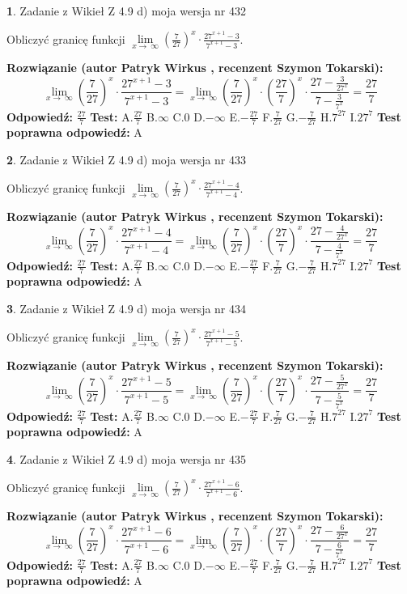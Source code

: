 \documentclass[12pt, a4paper]{article}
\theoremstyle{definition} %
\newtheorem{zad}{}
\newcommand{\zadStart}[1]{\begin{zad}#1\newline}
\newcommand{\zadStop}{\end{zad}}
\newcommand{\rozwStart}[2]{\noindent \textbf{Rozwiązanie (autor #1 , recenzent #2): }\newline}
\newcommand{\rozwStop}{\newline}
\newcommand{\odpStart}{\noindent \textbf{Odpowiedź:}\newline}
\newcommand{\odpStop}{\newline}
\newcommand{\testStart}{\noindent \textbf{Test:}\newline}
\newcommand{\testStop}{\newline}
\newcommand{\kluczStart}{\noindent \textbf{Test poprawna odpowiedź:}\newline}
\newcommand{\kluczStop}{\newline}
\begin{document}
\zadStart{Zadanie z Wikieł Z 4.9 d) moja wersja nr 432}


Obliczyć granicę funkcji  $\lim\limits_{x\to\ \infty}(\frac{7}{27})^{x}\cdot\frac{27^{x+1}-3}{7^{x+1}-3}$.
\zadStop
\rozwStart{Patryk Wirkus}{Szymon Tokarski}
$$\lim\limits_{x\to\ \infty}(\frac{7}{27})^{x}\cdot\frac{27^{x+1}-3}{7^{x+1}-3}=\lim\limits_{x\to\ \infty}(\frac{7}{27})^{x}\cdot(\frac{27}{7})^{x} \cdot \frac{27-\frac{3}{27^{x}}}{7-\frac{3}{7^{x}}} = \frac{27}{7}$$
\rozwStop
\odpStart
$\frac{27}{7}$
\odpStop
\testStart
A.$\frac{27}{7}$ B.$\infty$ C.$0$ D.$-\infty$ E.$-\frac{27}{7}$
F.$\frac{7}{27}$ G.$-\frac{7}{27}$
H.$7^{27}$
I.$27^{7}$
\testStop
\kluczStart
A
\kluczStop



\zadStart{Zadanie z Wikieł Z 4.9 d) moja wersja nr 433}


Obliczyć granicę funkcji  $\lim\limits_{x\to\ \infty}(\frac{7}{27})^{x}\cdot\frac{27^{x+1}-4}{7^{x+1}-4}$.
\zadStop
\rozwStart{Patryk Wirkus}{Szymon Tokarski}
$$\lim\limits_{x\to\ \infty}(\frac{7}{27})^{x}\cdot\frac{27^{x+1}-4}{7^{x+1}-4}=\lim\limits_{x\to\ \infty}(\frac{7}{27})^{x}\cdot(\frac{27}{7})^{x} \cdot \frac{27-\frac{4}{27^{x}}}{7-\frac{4}{7^{x}}} = \frac{27}{7}$$
\rozwStop
\odpStart
$\frac{27}{7}$
\odpStop
\testStart
A.$\frac{27}{7}$ B.$\infty$ C.$0$ D.$-\infty$ E.$-\frac{27}{7}$
F.$\frac{7}{27}$ G.$-\frac{7}{27}$
H.$7^{27}$
I.$27^{7}$
\testStop
\kluczStart
A
\kluczStop



\zadStart{Zadanie z Wikieł Z 4.9 d) moja wersja nr 434}


Obliczyć granicę funkcji  $\lim\limits_{x\to\ \infty}(\frac{7}{27})^{x}\cdot\frac{27^{x+1}-5}{7^{x+1}-5}$.
\zadStop
\rozwStart{Patryk Wirkus}{Szymon Tokarski}
$$\lim\limits_{x\to\ \infty}(\frac{7}{27})^{x}\cdot\frac{27^{x+1}-5}{7^{x+1}-5}=\lim\limits_{x\to\ \infty}(\frac{7}{27})^{x}\cdot(\frac{27}{7})^{x} \cdot \frac{27-\frac{5}{27^{x}}}{7-\frac{5}{7^{x}}} = \frac{27}{7}$$
\rozwStop
\odpStart
$\frac{27}{7}$
\odpStop
\testStart
A.$\frac{27}{7}$ B.$\infty$ C.$0$ D.$-\infty$ E.$-\frac{27}{7}$
F.$\frac{7}{27}$ G.$-\frac{7}{27}$
H.$7^{27}$
I.$27^{7}$
\testStop
\kluczStart
A
\kluczStop



\zadStart{Zadanie z Wikieł Z 4.9 d) moja wersja nr 435}


Obliczyć granicę funkcji  $\lim\limits_{x\to\ \infty}(\frac{7}{27})^{x}\cdot\frac{27^{x+1}-6}{7^{x+1}-6}$.
\zadStop
\rozwStart{Patryk Wirkus}{Szymon Tokarski}
$$\lim\limits_{x\to\ \infty}(\frac{7}{27})^{x}\cdot\frac{27^{x+1}-6}{7^{x+1}-6}=\lim\limits_{x\to\ \infty}(\frac{7}{27})^{x}\cdot(\frac{27}{7})^{x} \cdot \frac{27-\frac{6}{27^{x}}}{7-\frac{6}{7^{x}}} = \frac{27}{7}$$
\rozwStop
\odpStart
$\frac{27}{7}$
\odpStop
\testStart
A.$\frac{27}{7}$ B.$\infty$ C.$0$ D.$-\infty$ E.$-\frac{27}{7}$
F.$\frac{7}{27}$ G.$-\frac{7}{27}$
H.$7^{27}$
I.$27^{7}$
\testStop
\kluczStart
A
\kluczStop
\end{document}
